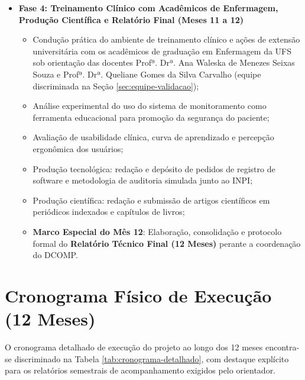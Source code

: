\begin{itemize}
    \item \textbf{Fase 4: Treinamento Clínico com Acadêmicos de Enfermagem, Produção Científica e Relatório Final (Meses 11 a 12)}
    \begin{itemize}
        \item Condução prática do ambiente de treinamento clínico e ações de extensão universitária com os acadêmicos de graduação em Enfermagem da UFS sob orientação das docentes Profª. Drª. Ana Waleska de Menezes Seixas Souza e Profª. Drª. Queliane Gomes da Silva Carvalho (equipe discriminada na Seção \ref{sec:equipe-validacao});
        \item Análise experimental do uso do sistema de monitoramento como ferramenta educacional para promoção da segurança do paciente;
        \item Avaliação de usabilidade clínica, curva de aprendizado e percepção ergonômica dos usuários;
        \item Produção tecnológica: redação e depósito de pedidos de registro de software e metodologia de auditoria simulada junto ao INPI;
        \item Produção científica: redação e submissão de artigos científicos em periódicos indexados e capítulos de livros;
        \item \textbf{Marco Especial do Mês 12}: Elaboração, consolidação e protocolo formal do \textbf{Relatório Técnico Final (12 Meses)} perante a coordenação do DCOMP.
    \end{itemize}
\end{itemize}

\section{Cronograma Físico de Execução (12 Meses)}
\label{sec:cronograma}

O cronograma detalhado de execução do projeto ao longo dos 12 meses encontra-se discriminado na Tabela \ref{tab:cronograma-detalhado}, com destaque explícito para os relatórios semestrais de acompanhamento exigidos pelo orientador.

